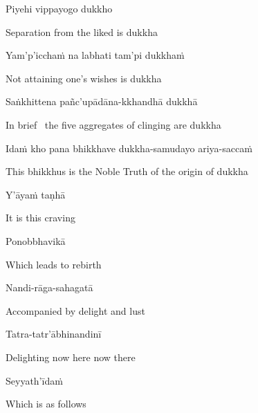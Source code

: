 Piyehi vippayogo dukkho

\begin{english}
  Separation from the liked is dukkha
\end{english}

Yam'p'icchaṁ na labhati tam'pi dukkhaṁ

\begin{english}
  Not attaining one's wishes is dukkha
\end{english}

Saṅkhittena pañc'upādāna-kkhandhā dukkhā

\begin{english}
  In brief \breathmark\ the five aggregates of clinging are dukkha\ifdigital\makeatletter\hyperlink{endnote54-appendix}\makeatother\fi
\end{english}

\begin{pali-hang}
Idaṁ kho pana bhikkhave dukkha-samudayo ariya-saccaṁ
\end{pali-hang}

\begin{english}
  This bhikkhus is the Noble Truth of the origin of dukkha
\end{english}

Y'āyaṁ taṇhā

\begin{english}
  It is this craving
\end{english}

Ponobbhavikā

\begin{english}
  Which leads to rebirth
\end{english}

Nandi-rāga-sahagatā

\begin{english}
  Accompanied by delight and lust
\end{english}

Tatra-tatr'ābhinandinī

\begin{english}
  Delighting now here now there
\end{english}

Seyyath'īdaṁ

\begin{english}
  Which is as follows
\end{english}

